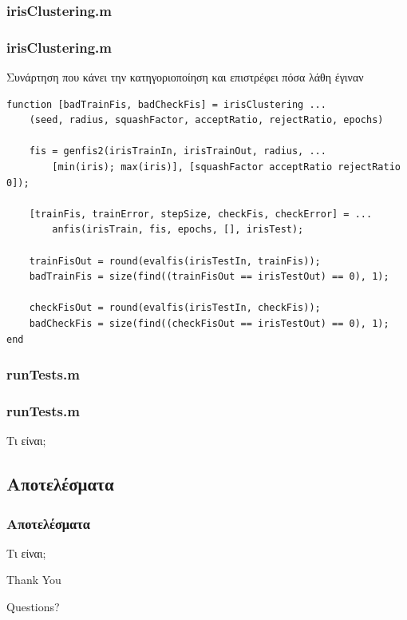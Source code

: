 \documentclass[xetex,serif,mathserif,14pt]{beamer}
\begin{document}

\subsubsection{irisClustering.m}
\begin{frame}[fragile]
\frametitle{irisClustering.m}
\small{Συνάρτηση που κάνει την κατηγοριοποίηση και επιστρέφει πόσα λάθη έγιναν}
\begin{lstlisting}
function [badTrainFis, badCheckFis] = irisClustering ...
    (seed, radius, squashFactor, acceptRatio, rejectRatio, epochs)

    fis = genfis2(irisTrainIn, irisTrainOut, radius, ...
        [min(iris); max(iris)], [squashFactor acceptRatio rejectRatio 0]);

    [trainFis, trainError, stepSize, checkFis, checkError] = ...
        anfis(irisTrain, fis, epochs, [], irisTest);

    trainFisOut = round(evalfis(irisTestIn, trainFis));
    badTrainFis = size(find((trainFisOut == irisTestOut) == 0), 1);

    checkFisOut = round(evalfis(irisTestIn, checkFis));
    badCheckFis = size(find((checkFisOut == irisTestOut) == 0), 1);
end
\end{lstlisting}
\end{frame}

\subsubsection{runTests.m}
\begin{frame}
\frametitle{runTests.m}
Τι είναι;
\end{frame}

\subsection{Αποτελέσματα}
\begin{frame}
\frametitle{Αποτελέσματα}
Τι είναι;
\end{frame}



\begin{frame}

\Huge{\centerline{Thank You}}
\Large{\centerline{Questions?}}
\end{frame}
\end{document}
